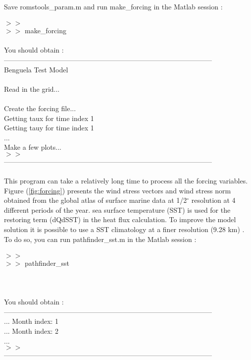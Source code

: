 Save romstools\_param.m and run make\_forcing in the Matlab session :
\\  \\
$>>$\\
$>>$ make\_forcing\\\\
You should obtain :\\
------------------------------------------------------------------------------------------\\
Benguela Test Model\\
\\
 Read in the grid...\\
\\
 Create the forcing file...\\
Getting taux for time index 1\\
Getting tauy for time index 1\\
...\\
Make a few plots...\\
$>>$\\
------------------------------------------------------------------------------------------\\\\
This program can take a relatively long time to process all the forcing variables.
Figure (\ref{fig:forcing}) presents the wind stress vectors and wind stress norm 
obtained from the global atlas of surface marine 
data at 1/2$^\circ$ resolution \citep{Das94} at 4 different periods of the year.
\citet {Das94} sea surface temperature (SST) is used for the restoring term (dQdSST)
in the heat flux calculation. To improve the model solution it is possible to 
use a SST climatology at a finer resolution (9.28 km) \citep{Cas99}. To do 
so, you can run pathfinder\_sst.m in the Matlab session :
\\  \\
$>>$\\
$>>$ pathfinder\_sst\\\\\\\\
You should obtain :\\
------------------------------------------------------------------------------------------\\
 ... Month index: 1 \\
 ... Month index: 2 \\
...\\
$>>$\\
------------------------------------------------------------------------------------------\\\\
